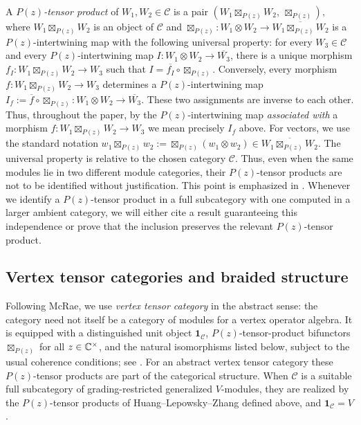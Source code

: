 \documentclass[10pt,a4paper]{amsart}
\numberwithin{equation}{section} \newtheorem{thm}{Theorem}[section] \newtheorem{lem}[thm]{Lemma} \newtheorem{ex}[thm]{Example} \newtheorem{prop}[thm]{Proposition} \newtheorem{cor}[thm]{Corollary} \newtheorem{defi}[thm]{Definition} \newtheorem{rmk}[thm]{Remark} \newtheorem{notation}[thm]{Notation}
\begin{document}
A \emph{$P(z)$-tensor product} of $W_1,W_2\in\mathcal C$ is a pair \(\left(W_1\boxtimes_{P(z)}W_2,\ \boxtimes_{P(z)}\right),\) where $W_1\boxtimes_{P(z)}W_2$ is an object of $\mathcal C$ and \(\boxtimes_{P(z)}:W_1\otimes W_2\longrightarrow\overline{W_1\boxtimes_{P(z)}W_2}\) is a $P(z)$-intertwining map with the following universal property: for every $W_3\in\mathcal C$ and every $P(z)$-intertwining map \(I:W_1\otimes W_2\longrightarrow\overline{W_3}\), there is a unique morphism \(f_I:W_1\boxtimes_{P(z)}W_2\longrightarrow W_3\) such that \(I=\overline{f_I}\circ\boxtimes_{P(z)}.\) Conversely, every morphism \(f:W_1\boxtimes_{P(z)}W_2\longrightarrow W_3\) determines a $P(z)$-intertwining map \(I_f:=\overline f\circ\boxtimes_{P(z)}:W_1\otimes W_2\longrightarrow\overline{W_3}.\) These two assignments are inverse to each other. Thus, throughout the paper, by the $P(z)$-intertwining map \emph{associated with} a morphism $f:W_1\boxtimes_{P(z)}W_2\to W_3$ we mean precisely $I_f$ above. For vectors, we use the standard notation \(w_1\boxtimes_{P(z)}w_2:=\boxtimes_{P(z)}(w_1\otimes w_2)\in\overline{W_1\boxtimes_{P(z)}W_2}.\) The universal property is relative to the chosen category $\mathcal C$. Thus, even when the same modules lie in two different module categories, their $P(z)$-tensor products are not to be identified without justification. This point is emphasized in \cite[Remark~2.3]{McRae}. Whenever we identify a $P(z)$-tensor product in a full subcategory with one computed in a larger ambient category, we will either cite a result guaranteeing this independence or prove that the inclusion preserves the relevant $P(z)$-tensor product.

\subsection{Vertex tensor categories and braided structure}

Following McRae, we use \emph{vertex tensor category} in the abstract sense: the category need not itself be a category of modules for a vertex operator algebra. It is equipped with a distinguished unit object $\mathbf 1_{\mathcal C}$, $P(z)$-tensor-product bifunctors $\boxtimes_{P(z)}$ for all $z\in\mathbb{C}^\times$, and the natural isomorphisms listed below, subject to the usual coherence conditions; see \cite[\S2.1]{McRae}. For an abstract vertex tensor category these $P(z)$-tensor products are part of the categorical structure. When $\mathcal C$ is a suitable full subcategory of grading-restricted generalized $V$-modules, they are realized by the $P(z)$-tensor products of Huang--Lepowsky--Zhang defined above, and $\mathbf 1_{\mathcal C}=V$.
\end{document}
